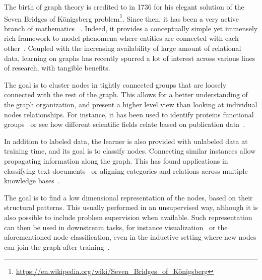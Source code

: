 The birth of graph theory is credited to \textcite{euler1741} in 1736 for his elegant solution of
the Seven Bridges of Königsberg
problem\footnote{\url{https://en.wikipedia.org/wiki/Seven_Bridges_of_Königsberg}}. Since then,
it has been a very active branch of mathematics ~\autocite{biggs1976graph}. Indeed, it provides a
conceptually simple yet immensely rich framework to model phenomena where entities are connected
with each other~\autocite{ComplexNetworksApp11}. Coupled with the increasing availability of large
amount of relational data, learning on graphs has recently spurred a lot of interest across various
lines of research, with tangible benefits.

\begin{description}[leftmargin=*]

  \item[community detection~\autocite{FortunatoSurvey10}] The goal is to cluster nodes in tightly
    connected groups that are loosely connected with the rest of the graph. This allows for a better
    understanding of the graph organization, and present a higher level view than looking at
    individual nodes relationships. For instance, it has been used to identify proteins functional
    groups~\autocite{clusterBio03} or see how different scientific fields relate based on
    publication data~\autocite{clusterScience08}.

  \item[semi-supervised learning~\autocites{SSL06}{graphSSL14}] In addition to labeled data,
    the learner is also provided with unlabeled data at training time, and its goal is to classify
    nodes. Connecting similar instances allow propagating information along the graph. This has
    found applications in classifying text documents~\autocite{sslText09} or aligning categories and
    relations across multiple knowledge bases~\autocite{sslKB13}.


  \item[node embedding~\autocite{representationLearning17}] The goal is to find a low dimensional
    representation of the nodes, based on their structural patterns. This usually performed in an
    unsupervised way, although it is also possible to include problem supervision when available.
    Such representation can then be used in downstream tasks, for instance
    visualization~\autocite{LINE15} or the aforementioned node classification, even in the inductive
    setting where new nodes can join the graph after training~\autocite{inductiveRepresentation17}.


\end{description}
